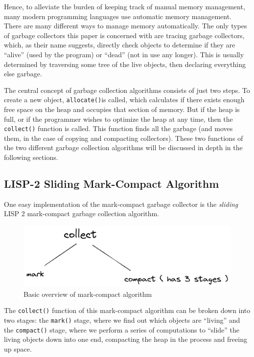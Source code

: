 \documentclass[index]{subfiles}
\begin{document}
Hence, to alleviate the burden of keeping track of manual memory management, many modern programming languages use automatic memory management. There are many different ways to manage memory automatically. The only types of garbage collectors this paper is concerned with are tracing garbage collectors, which, as their name suggests, directly check objects to determine if they are ``alive'' (used by the program) or ``dead'' (not in use any longer)\cite{a_unified_theory_of_garbage_collection}. This is usually determined by traversing some tree of the live objects\cite[Chapter~1]{gc_handbook}, then declaring everything else garbage.

The central concept of garbage collection algorithms consists of just two steps. To create a new object, \verb+allocate()+is called, which calculates if there exists enough free space on the heap and occupies that section of memory. But if the heap is full, or if the programmer wishes to optimize the heap at any time, then the \verb+collect()+\cite{gc_handbook} function is called. This function finds all the garbage (and moves them, in the case of copying and compacting collectors). These two functions of the two different garbage collection algorithms will be discussed in depth in the following sections.

\subsection{LISP-2 Sliding Mark-Compact Algorithm}

One easy implementation of the mark-compact garbage collector is the \textit{sliding} LISP 2 mark-compact garbage collection algorithm.

\begin{figure}[H]
    \centering
    \includegraphics[scale=0.3]{pics/mark-compact-overview.png}
    \caption{Basic overview of mark-compact algorithm}
\end{figure}

The \verb+collect()+ function of this mark-compact algorithm can be broken down into two stages: the \verb+mark()+ stage, where we find out which objects are ``living'' and the \verb+compact()+ stage, where we perform a series of computations to ``slide'' the living objects down into one end, compacting the heap in the process and freeing up space\cite[Chapter~3]{gc_handbook}.
\end{document}
